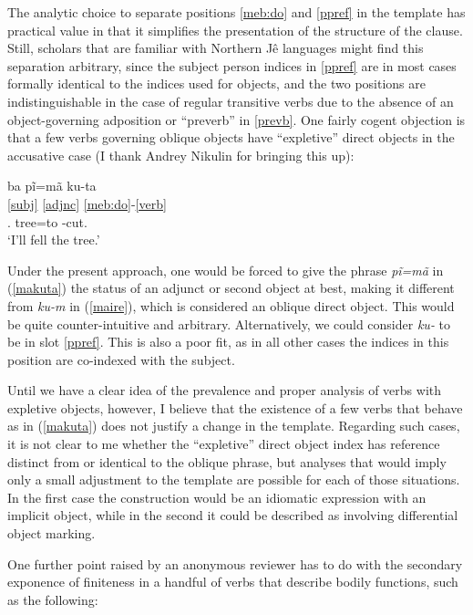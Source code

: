 \documentclass[output=paper]{langscibook}
\begin{document}
The analytic choice to separate positions \ref{meb:do} and \ref{ppref} in the template has practical value in that it simplifies the presentation of the structure of the clause. Still, scholars that are familiar with Northern Jê languages might find this separation arbitrary, since the subject person indices in \ref{ppref} are in most cases formally identical to the indices used for objects, and the two positions are indistinguishable in the case of regular transitive verbs due to the absence of an object-governing adposition or ``preverb'' in \ref{prevb}. One fairly cogent objection is that a few verbs governing oblique objects have ``expletive'' direct objects in the accusative case (I thank Andrey Nikulin for bringing this up):

\ea\label{makuta}\glll ba pĩ=mã ku-ta\\
    \ref{subj} \ref{adjnc} \ref{meb:do}-\ref{verb}\\
    \First.\Nom{} tree=to \Third\Acc{}-cut.\Fin{}\\
  \glt `I'll fell the tree.'
\z


Under the present approach, one would be forced to give the phrase {\em pĩ=mã} in (\ref{makuta}) the status of an adjunct or second object at best, making it different from {\em ku-m} in (\ref{maire}), which is considered an oblique direct object. This would be quite counter-intuitive and arbitrary. Alternatively, we could consider {\em ku-} to be in slot \ref{ppref}. This is also a poor fit, as in all other cases the indices in this position are co-indexed with the subject.

Until we have a clear idea of the prevalence and proper analysis of verbs with expletive objects, however, I believe that the existence of a few verbs that behave as in (\ref{makuta}) does not justify a change in the template. Regarding such cases, it is not clear to me whether the ``expletive'' direct object index has reference distinct from or identical to the oblique phrase, but analyses that would imply only a small adjustment to the template are possible for each of those situations. In the first case the construction would be an idiomatic expression with an implicit object, while in the second it could be described as involving differential object marking.


One further point raised by an anonymous reviewer has to do with the secondary exponence of finiteness in a handful of verbs that describe bodily functions, such as the following:
\end{document}
